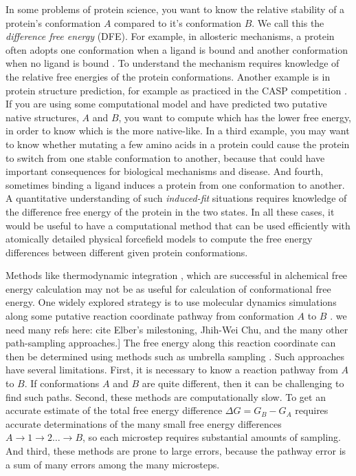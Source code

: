 \documentclass[12pt]{article}
\newcommand{\Ken}[1]{\color{red}#1\normalcolor}
\begin{document}
In some problems of protein science, you want to know the relative stability of a protein's conformation $A$ compared to it's 
conformation $B$.  We call this the \emph{difference free energy} (DFE). For example, in allosteric mechanisms, a protein often 
adopts one conformation when a ligand is bound and another conformation when no ligand is bound \cite{Elber2007}. To understand the mechanism requires knowledge 
of the relative free energies of the protein conformations.  Another example is in protein structure prediction, for example as practiced in 
the CASP competition \cite{Moult2011}.  If you are using some computational model and have predicted two putative native structures, $A$ 
and $B$, you want to compute which has the lower free energy, in order to know which is the more native-like.  In a third example, you may 
want to know whether mutating a few amino acids in a protein could cause the protein to switch from one stable conformation to another, because 
that could have important consequences for biological mechanisms and disease.  And fourth, sometimes binding a ligand induces a protein from 
one conformation to another.  A quantitative understanding of such \emph{induced-fit} situations requires knowledge of the difference free 
energy of the protein in the two states. In all these cases, it would be useful to have a computational method that can be used efficiently 
with atomically detailed physical forcefield models to compute the free energy differences between different given protein conformations.

Methods like thermodynamic integration \cite{Tironi1994},\cite{Meirovitch2007} which are successful in alchemical free energy calculation
may not be as useful for calculation of conformational free energy.
One widely explored strategy is to use molecular dynamics simulations along some putative reaction coordinate pathway from conformation $A$ 
to $B$ \cite{Elber2007,West2007,Haas2007,Jonsson1998,E2007,Dellago2002,Cheng2006}. \Ken{we need 
many refs here: cite Elber's milestoning, Jhih-Wei Chu, and the many other path-sampling approaches.]} The free energy along this reaction 
coordinate can then be determined using methods such as umbrella sampling \cite{Torrie1977}. Such approaches have several limitations.  
First, it is necessary to know a reaction pathway from $A$ to $B$. If conformations $A$ and $B$ are quite different, then it can be 
challenging to find such paths. Second, these methods 
are computationally slow. To get an accurate estimate of the total free energy difference $\Delta G = G_B - G_A$ requires accurate determinations 
of the many small free energy differences $A \rightarrow 1 \rightarrow 2 \ldots \rightarrow B$, so each microstep requires substantial amounts 
of sampling.  And third, these methods are prone to large errors, because the pathway error is a sum of many errors among the many microsteps.
\end{document}
